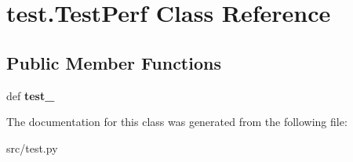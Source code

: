 \hypertarget{classtest_1_1_test_perf}{\section{test.\-Test\-Perf \-Class \-Reference}
\label{classtest_1_1_test_perf}
}
\subsection*{\-Public \-Member \-Functions}
\begin{DoxyCompactItemize}
\item 
\hypertarget{classtest_1_1_test_perf_ae83d1066d3b9b32d1560c23e11b9b3e0}{def {\bfseries test\-\_\-}}\label{classtest_1_1_test_perf_ae83d1066d3b9b32d1560c23e11b9b3e0}

\end{DoxyCompactItemize}


\-The documentation for this class was generated from the following file\-:\begin{DoxyCompactItemize}
\item 
src/test.\-py\end{DoxyCompactItemize}
